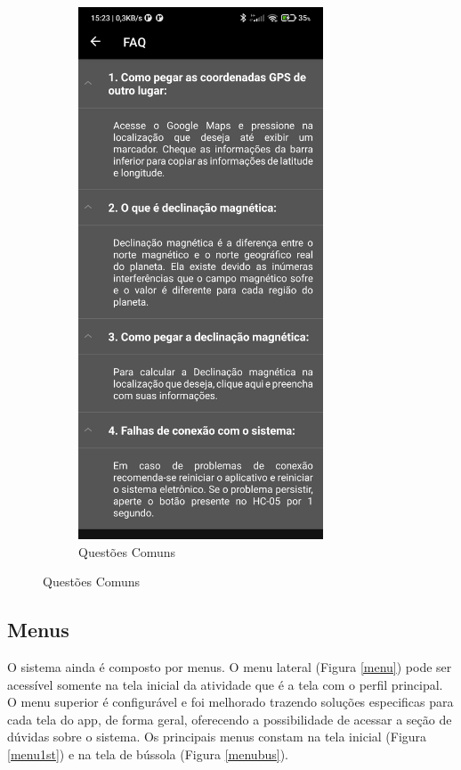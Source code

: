 \begin{figure}[!htb]
\begin{subfigure}[b]{0.4\textwidth}
		\includegraphics[width=0.8\textwidth]{figuras/desAplicativo/faq}
		\caption{Questões Comuns}
		\label{faq}
	\end{subfigure}
\end{figure}

\subsection{Menus}

O sistema ainda é composto por menus. O menu lateral (Figura \ref{menu}) pode ser acessível somente na tela inicial da atividade que é a tela com o perfil principal. O menu superior é configurável e foi melhorado trazendo soluções especificas para cada tela do app, de forma geral, oferecendo a possibilidade de acessar a seção de dúvidas sobre o sistema. Os principais menus constam na tela inicial (Figura \ref{menu1st}) e na tela de bússola (Figura \ref{menubus}).

